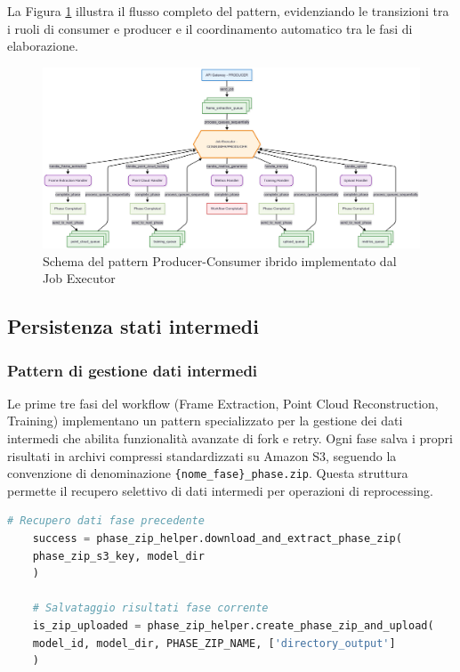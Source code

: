 La Figura \ref{fig:producer_consumer_schema} illustra il flusso completo del pattern, evidenziando le transizioni tra i ruoli di consumer e producer e il coordinamento automatico tra le fasi di elaborazione.

\begin{figure}[htbp]
	\centering
	\includegraphics[width=\textwidth]{images/producer_consumer_schema.jpg}
	\caption{Schema del pattern Producer-Consumer ibrido implementato dal Job Executor}
	\label{fig:producer_consumer_schema}
\end{figure}
\newpage
\subsection{Persistenza stati intermedi}

\subsubsection{Pattern di gestione dati intermedi}

Le prime tre fasi del workflow (Frame Extraction, Point Cloud Reconstruction, Training) implementano un pattern specializzato per la gestione dei dati intermedi che abilita funzionalità avanzate di fork e retry.
\newline
Ogni fase salva i propri risultati in archivi compressi standardizzati su Amazon S3, seguendo la convenzione di denominazione \texttt{\{nome\_fase\}\_phase.zip}. Questa struttura permette il recupero selettivo di dati intermedi per operazioni di reprocessing.

\begin{lstlisting}[language=python, caption=Pattern recupero e salvataggio dati intermedi]
	# Recupero dati fase precedente
	success = phase_zip_helper.download_and_extract_phase_zip(
	phase_zip_s3_key, model_dir
	)
	
	# Salvataggio risultati fase corrente
	is_zip_uploaded = phase_zip_helper.create_phase_zip_and_upload(
	model_id, model_dir, PHASE_ZIP_NAME, ['directory_output']
	)
\end{lstlisting}

